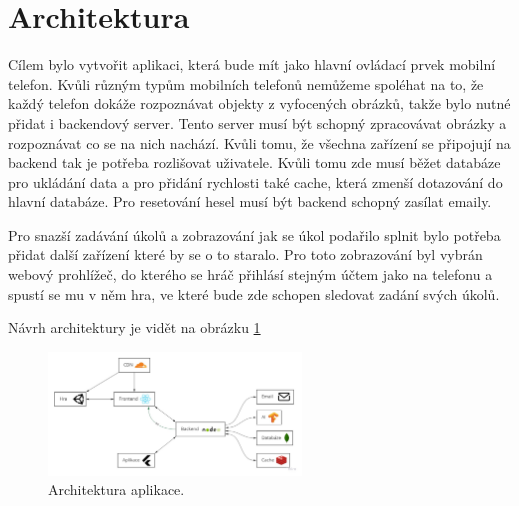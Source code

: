 \section{Architektura}

Cílem bylo vytvořit aplikaci, která bude mít jako hlavní ovládací prvek mobilní telefon. Kvůli různým typům mobilních telefonů nemůžeme spoléhat na to, že každý telefon dokáže rozpoznávat objekty z vyfocených obrázků, takže bylo nutné přidat i backendový server. Tento server musí být schopný zpracovávat obrázky a rozpoznávat co se na nich nachází. Kvůli tomu, že všechna zařízení se připojují na backend tak je potřeba rozlišovat uživatele. Kvůli tomu zde musí běžet databáze pro ukládání data a pro přidání rychlosti také cache, která zmenší dotazování do hlavní databáze. Pro resetování hesel musí být backend schopný zasílat emaily. \par
Pro snazší zadávání úkolů a zobrazování jak se úkol podařilo splnit bylo potřeba přidat další zařízení které by se o to staralo. Pro toto zobrazování byl vybrán webový prohlížeč, do kterého se hráč přihlásí stejným účtem jako na telefonu a spustí se mu v něm hra, ve které bude zde schopen sledovat zadání svých úkolů.\par
Návrh architektury je vidět na obrázku \ref{fig:architektura}

\begin{figure}[h]
    \centering
    \includegraphics[width=0.6\textwidth]{img/architektura.jpg}
    \caption{Architektura aplikace.}
    \label{fig:architektura}
\end{figure}